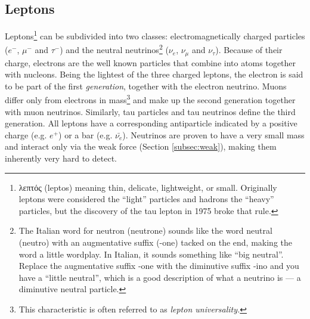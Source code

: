 \subsection{Leptons}
Leptons\footnote{\gr λεπτός \en (leptos) meaning thin, delicate, lightweight, or small. Originally leptons were considered the ``light'' particles and hadrons the ``heavy'' particles, but the discovery of the tau lepton in 1975 broke that rule.} can be subdivided into two classes: electromagnetically charged particles ($e^-$, $\mu^-$ and $\tau^-$) and the neutral neutrinos\footnote{The Italian word for neutron (neutrone) sounds like the word neutral (neutro) with an augmentative suffix (-one) tacked on the end, making the word a little wordplay. In Italian, it sounds something like ``big neutral''. Replace the augmentative suffix -one with the diminutive suffix -ino and you have a ``little neutral'', which is a good description of what a neutrino is — a diminutive neutral particle.} ($\nu_{e}$, $\nu_{\mu}$ and $\nu_{\tau}$). Because of their charge, electrons are the well known particles that combine into atoms together with nucleons. Being the lightest of the three charged leptons, the electron is said to be part of the first \textit{generation}, together with the electron neutrino. Muons differ only from electrons in mass\footnote{This characteristic is often referred to as \textit{lepton universality.}} and make up the second generation together with muon neutrinos. Similarly, tau particles and tau neutrinos define the third generation. All leptons have a corresponding antiparticle indicated by a positive charge (e.g. $e^+$) or a bar (e.g. $\bar{\nu_e}$). Neutrinos are proven to have a very small mass \cite{RevModPhys.88.030502} and interact only via the weak force (Section \ref{subsec:weak}), making them inherently very hard to detect.

